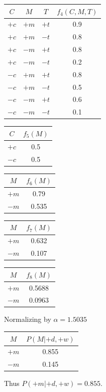 \documentclass[12pt]{article}
\begin{document}
\begin{enumerate}
\begin{center}
  \begin{tabular}{|c|c|c|c|}
    \hline
    $C$ & $M$ & $T$ & $f_4(C,M,T)$ \\
    \hline
    $+c$ & $+m$ & $+t$ & 0.9 \\
    \hline
    $+c$ & $+m$ & $-t$ & 0.8 \\
    \hline
    $+c$ & $-m$ & $+t$ & 0.8 \\
    \hline
    $+c$ & $-m$ & $-t$ & 0.2 \\
    \hline
    $-c$ & $+m$ & $+t$ & 0.8 \\
    \hline
    $-c$ & $+m$ & $-t$ & 0.5 \\
    \hline
    $-c$ & $-m$ & $+t$ & 0.6 \\
    \hline
    $-c$ & $-m$ & $-t$ & 0.1 \\
    \hline
  \end{tabular}

  \begin{tabular}{|c|c|}
    \hline
    $C$ & $f_5(M)$ \\
    \hline
    $+c$ & 0.5 \\
    \hline
    $-c$ & 0.5 \\
    \hline
  \end{tabular}

  \begin{tabular}{|c|c|}
    \hline
    $M$ & $f_6(M)$ \\
    \hline
    $+m$ & 0.79 \\
    \hline
    $-m$ & 0.535 \\
    \hline
  \end{tabular}

  \begin{tabular}{|c|c|}
    \hline
    $M$ & $f_7(M)$ \\
    \hline
    $+m$ & 0.632 \\
    \hline
    $-m$ & 0.107 \\
    \hline
  \end{tabular}

  \begin{tabular}{|c|c|}
    \hline
    $M$ & $f_8(M)$ \\
    \hline
    $+m$ & 0.5688 \\
    \hline
    $-m$ & 0.0963 \\
    \hline
  \end{tabular}

  Normalizing by $\alpha = 1.5035$

  \begin{tabular}{|c|c|}
    \hline
    $M$ & $P(M|+d,+w)$ \\
    \hline
    $+m$ & 0.855 \\
    \hline
    $-m$ & 0.145 \\
    \hline
  \end{tabular}
\end{center}

Thus $P(+m|+d,+w) = 0.855$.

\end{enumerate}
\end{document}
